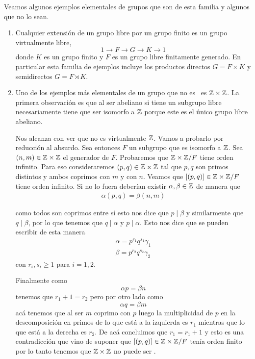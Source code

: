 \documentclass[tesis.tex]{subfiles}
\begin{document}
\begin{ej}
	Veamos algunos ejemplos elementales de grupos que son de esta familia y algunos que no lo sean.
	
	\begin{enumerate}	
		\item 
		Cualquier extensión de un grupo libre por un grupo finito es un grupo virtualmente libre,
		\[
		1 \to F \to G \to K \to 1
		\]
		donde $K$ es un grupo finito y $F$ es un grupo libre finitamente generado.
		En particular esta familia de ejemplos incluye los productos directos $G= F \times K$ y semidirectos $G = F \rtimes K$.
		
		
		\item Uno de los ejemplos más elementales de un grupo que no es \vl \ es $\mathbb{Z} \times \mathbb{Z}$.
		La primera observación es que al ser abeliano si tiene un subgrupo libre necesariamente tiene que ser isomorfo a $\mathbb{Z}$ porque este es el único grupo libre abeliano.
		
		Nos alcanza con ver que no es virtualmente $\mathbb{Z}$.
		Vamos a probarlo por reducción al absurdo. 
		Sea entonces $F$ un subgrupo que es isomorfo a $\mathbb{Z}$.
		Sea $(n,m) \in \mathbb{Z} \times \mathbb{Z}$ el generador de $F$.
		Probaremos que $\mathbb{Z} \times \mathbb{Z} / F$ tiene orden infinito.
		Para eso consideraremos $(p,q) \in \mathbb{Z} \times \mathbb{Z}$	tal que $p,q$ son primos distintos y ambos coprimos con $m$ y con $n$.
		Veamos que $[(p,q)] \in \mathbb{Z} \times \mathbb{Z} / F$ tiene orden infinito.
		Si no lo fuera deberían existir $\alpha, \beta \in \mathbb{Z}$ de manera que 
		\begin{align*}
			\alpha (p,q) = \beta(n,m) 
		\end{align*}
		
		como todos son coprimos entre sí esto nos dice que $p \mid \beta$ y similarmente que $q \mid \beta$, por lo que tenemos que $q \mid \alpha$ y $p \mid \alpha$.
		Esto nos dice que se pueden escribir de esta manera
		\begin{align*}
			\alpha = p^{r_1} q^{s_1} \gamma_1 \\
			\beta = p^{r_2} q^{s_2} \gamma_2
		\end{align*}
		con $r_i, s_i \ge 1$ para $i=1,2$.
		
		Finalmente como 
		\[ 
		\alpha p = \beta n
		\]
		tenemos que $r_1+ 1 = r_2$ pero por otro lado como
		\[
		\alpha q  = \beta m
		\]
		acá tenemos que al ser $m$ coprimo con $p$ luego la multiplicidad de $p$ en la descomposición en primos de lo que está a la izquierda es $r_1$ mientras que lo que está a la derecha es $r_2$.
		De acá concluimos que $r_{1} = r_{1} + 1$ y esto es una contradicción que vino de suponer que $[(p,q)] \in \mathbb{Z} \times \mathbb{Z} / F$ tenía orden finito por lo tanto tenemos que $\mathbb{Z} \times \mathbb{Z}$ no puede ser \vl.
		
	\end{enumerate}
\end{ej}
\end{document}
